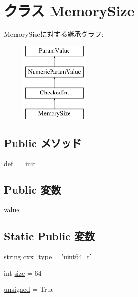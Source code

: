 \hypertarget{classm5_1_1params_1_1MemorySize}{
\section{クラス MemorySize}
\label{classm5_1_1params_1_1MemorySize}
}
MemorySizeに対する継承グラフ:\begin{figure}[H]
\begin{center}
\leavevmode
\includegraphics[height=4cm]{classm5_1_1params_1_1MemorySize}
\end{center}
\end{figure}
\subsection*{Public メソッド}
\begin{DoxyCompactItemize}
\item 
def \hyperlink{classm5_1_1params_1_1MemorySize_ac775ee34451fdfa742b318538164070e}{\_\-\_\-init\_\-\_\-}
\end{DoxyCompactItemize}
\subsection*{Public 変数}
\begin{DoxyCompactItemize}
\item 
\hyperlink{classm5_1_1params_1_1MemorySize_afcc7a4b78ecd8fa7e713f8cfa0f51017}{value}
\end{DoxyCompactItemize}
\subsection*{Static Public 変数}
\begin{DoxyCompactItemize}
\item 
string \hyperlink{classm5_1_1params_1_1MemorySize_a2f1553ebb79374a68b36fdd6d8d82fc3}{cxx\_\-type} = 'uint64\_\-t'
\item 
int \hyperlink{classm5_1_1params_1_1MemorySize_a439227feff9d7f55384e8780cfc2eb82}{size} = 64
\item 
\hyperlink{classm5_1_1params_1_1MemorySize_aca40206900cfc164654362fa8d4ad1e6}{unsigned} = True
\end{DoxyCompactItemize}


